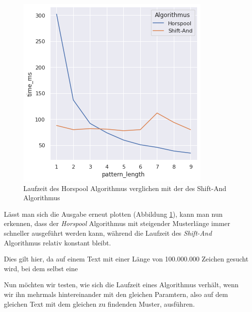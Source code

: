 \documentclass[twocolumn]{article}
\begin{document}
\begin{figure}
    \includegraphics[width=\linewidth]{assets/graph_2.png}
    \caption{Laufzeit des Horspool Algorithmus verglichen mit der des Shift-And Algorithmus}
    \label{fig:runtime_horspool_shift_and}
\end{figure}

Lässt man sich die Ausgabe erneut plotten (Abbildung \ref{fig:runtime_horspool_shift_and}), kann man nun erkennen, dass der \textit{Horspool} Algorithmus mit steigender Musterlänge immer schneller ausgeführt werden kann, während die Laufzeit des \textit{Shift-And} Algorithmus relativ konstant bleibt.

Dies gilt hier, da auf einem Text mit einer Länge von 100.000.000 Zeichen gesucht wird, bei dem selbst eine 

Nun möchten wir testen, wie sich die Laufzeit eines Algorithmus verhält, wenn wir ihn mehrmals hintereinander mit den gleichen Paramtern, also auf dem gleichen Text mit dem gleichen zu findenden Muster, ausführen.
\end{document}
